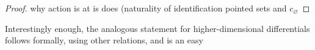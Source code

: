 \begin{proof}
%
%
%
%
%
%
%
%
%
%
%
%
%
%
%
 why action is at is does (naturality of identification pointed sets and $c_\varnothing$
%
%
\end{proof}
Interestingly enough, the analogous statement for higher-dimensional differentials follows formally, using other relations, and is an easy

